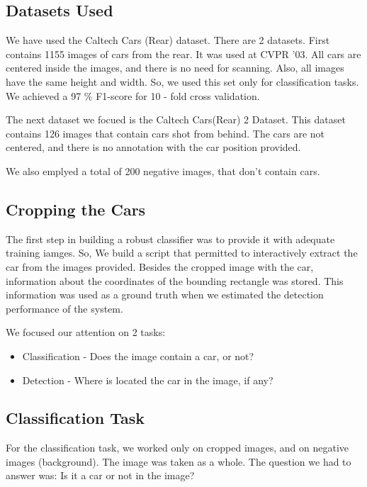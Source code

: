
\subsection{Datasets Used}

We have used the Caltech Cars (Rear) dataset. There are 2 datasets. First contains 1155 images of cars from the rear. It was used at CVPR '03. All cars are centered inside the images, and there is no need for scanning. Also, all images have the same height and width. So, we used this set only for classification tasks. We achieved a 97 \% F1-score for 10 - fold cross validation.

The next dataset we focued is the Caltech Cars(Rear) 2 Dataset. This dataset contains 126 images that contain cars shot from behind. The cars are not centered, and there is no annotation with the car position provided.

We also emplyed a total of 200 negative images, that don't contain cars.

\subsection{Cropping the Cars}

The first step in building a robust classifier was to provide it with adequate training iamges. So, We build a script that permitted to interactively extract the car from the images provided. Besides the cropped image with the car, information about the coordinates of the bounding rectangle was stored. This information was used as a ground truth when we estimated the detection performance of the system.

We focused our attention on 2 tasks:

\begin{itemize}
\item Classification - Does the image contain a car, or not?
\item Detection - Where is located the car in the image, if any?
\end{itemize}

\subsection{Classification Task}

For the classification task, we worked only on cropped images, and on negative images (background). The image was taken as a whole. The question we had to answer was: Is it a car or not in the image?

